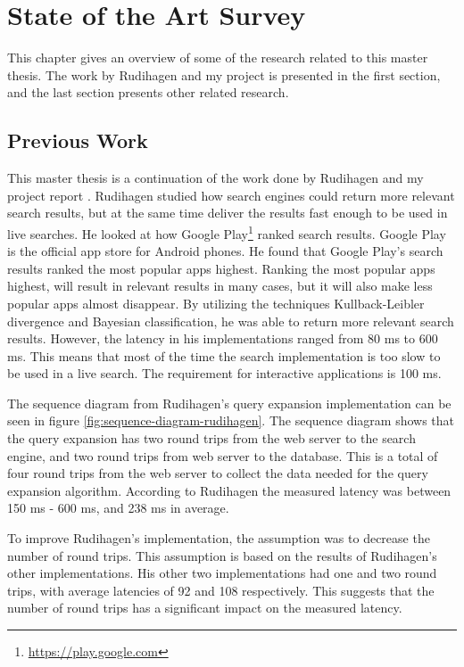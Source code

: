 \chapter{State of the Art Survey}
\label{ch:related-work}
This chapter gives an overview of some of the research related to this master thesis.
The work by Rudihagen and my project is presented in the first section,
and the last section presents other related research.


\section{Previous Work}
\label{sec:previous-work}
This master thesis is a continuation of the work done by Rudihagen \cite{master-thesis} and my project report \cite{project-report}.
Rudihagen studied how search engines could return more relevant search results,
but at the same time deliver the results fast enough to be used in live searches.
He looked at how Google Play\footnote{\url{https://play.google.com}} ranked search results.
Google Play is the official app store for Android phones.
He found that Google Play's search results ranked the most popular apps highest.
Ranking the most popular apps highest, will result in relevant results in many cases,
but it will also make less popular apps almost disappear.
By utilizing the techniques Kullback-Leibler divergence and Bayesian classification,
he was able to return more relevant search results.
However, the latency in his implementations ranged from 80 ms to 600 ms.
This means that most of the time the search implementation is too slow to be used in a live search.
The requirement for interactive applications is 100 ms.

The sequence diagram from Rudihagen's query expansion implementation can be seen in figure \ref{fig:sequence-diagram-rudihagen}.
The sequence diagram shows that the query expansion has two round trips from the web server to the search engine,
and two round trips from web server to the database.
This is a total of four round trips from the web server to collect the data needed for the query expansion algorithm.
According to Rudihagen the measured latency was between 150 ms - 600 ms, and 238 ms in average.

To improve Rudihagen's implementation, the assumption was to decrease the number of round trips.
This assumption is based on the results of Rudihagen's other implementations.
His other two implementations had one and two round trips,
with average latencies of 92 and 108 respectively.
This suggests that the number of round trips has a significant impact on the measured latency.

